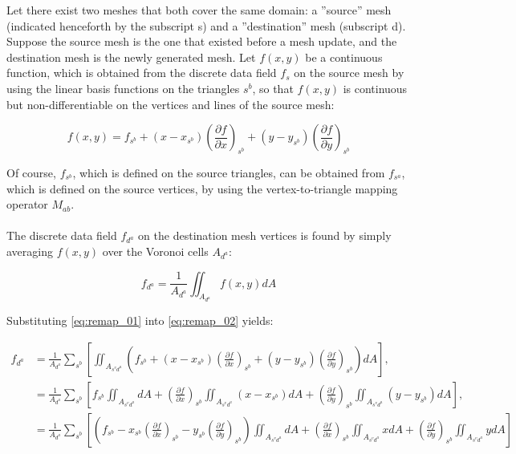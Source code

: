 \documentclass{article}
\begin{document}
Let there exist two meshes that both cover the same domain: a ”source” mesh (indicated henceforth by the subscript s) and a ”destination” mesh (subscript d). Suppose the source mesh is the one that existed before a mesh update, and the destination mesh is the newly generated mesh. Let $f(x,y)$ be a continuous function, which is obtained from the discrete data field $f_s$ on the source mesh by using the linear basis functions on the triangles $s^b$, so that $f(x,y)$ is continuous but non-differentiable on the vertices and lines of the source mesh:

\begin{equation} \label{eq:remap_01}
f(x,y) = f_{s^b} + (x - x_{s^b}) {\left( \frac{\partial f}{\partial x} \right)}_{s^b} + (y - y_{s^b}) {\left( \frac{\partial f}{\partial y} \right)}_{s^b}
\end{equation}

Of course, $f_{s^b}$, which is defined on the source triangles, can be obtained from $f_{s^a}$, which is defined on the source vertices, by using the vertex-to-triangle mapping operator $M_{ab}$.\\
\\
The discrete data field $f_{d^a}$ on the destination mesh vertices is found by simply averaging $f(x,y)$ over the Voronoi cells $A_{d^a}$:

\begin{equation} \label{eq:remap_02}
f_{d^a} = \frac{1}{A_{d^a}} \iint_{A_{d^a}} f(x,y) dA
\end{equation}

Substituting \eqref{eq:remap_01} into \eqref{eq:remap_02} yields:

\begin{align} \label{eq:remap_03}
f_{d^a} &= \frac{1}{A_{d^a}} \sum_{s^b} \left[ \iint_{A_{s^v d^a}} \left( f_{s^b} + (x - x_{s^b}) {\left( \frac{\partial f}{\partial x} \right)}_{s^b} + (y - y_{s^b}) {\left( \frac{\partial f}{\partial y} \right)}_{s^b} \right) dA \right], \\
  &= \frac{1}{A_{d^a}} \sum_{s^b} \left[ f_{s^b}  \iint_{A_{s^v d^a}} dA + 
  {\left( \frac{\partial f}{\partial x} \right)}_{s^b} \iint_{A_{s^v d^a}} (x - x_{s^b}) dA + 
  {\left( \frac{\partial f}{\partial y} \right)}_{s^b} \iint_{A_{s^v d^a}} (y - y_{s^b}) dA  \right], \\ 
  &= \frac{1}{A_{d^a}} \sum_{s^b} \left[ \left( f_{s^b}
  - x_{s^b} {\left( \frac{\partial f}{\partial x} \right)}_{s^b}
  - y_{s^b}  {\left( \frac{\partial f}{\partial y} \right)}_{s^b} \right) \iint_{A_{s^v d^a}} dA +
  {\left( \frac{\partial f}{\partial x} \right)}_{s^b} \iint_{A_{s^v d^a}} x dA + 
  {\left( \frac{\partial f}{\partial y} \right)}_{s^b} \iint_{A_{s^v d^a}} y dA 
  \right]
\end{align}
\end{document}
